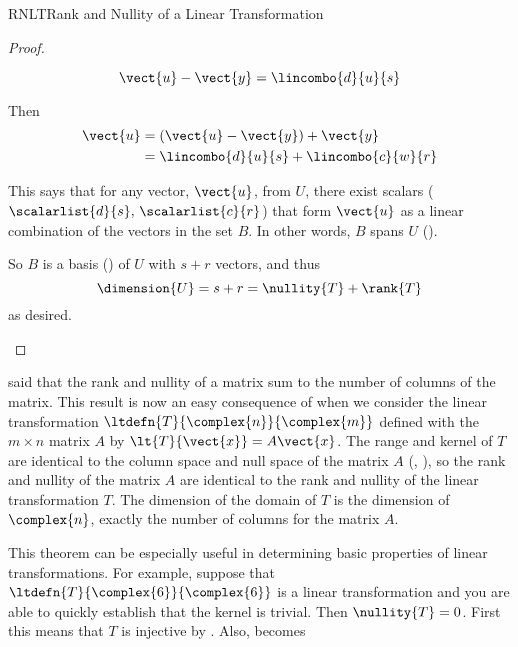 \begin{subsect}{RNLT}{Rank and Nullity of a Linear Transformation}
\begin{proof}
\begin{para}
%
\begin{equation*}
\vect{u}-\vect{y}=\lincombo{d}{u}{s}
\end{equation*}
\end{para}
%
\begin{para}Then
%
\begin{align*}
\vect{u}&=\left(\vect{u}-\vect{y}\right)+\vect{y}\\
&=\lincombo{d}{u}{s}+\lincombo{c}{w}{r}
\end{align*}
\end{para}
%
\begin{para}This says that for any vector, $\vect{u}$, from $U$, there exist scalars ($\scalarlist{d}{s},\,\scalarlist{c}{r}$) that form $\vect{u}$ as a linear combination of the vectors in the set $B$.  In other words, $B$ spans $U$ ().\end{para}
%
\begin{para}So $B$ is a basis () of $U$ with $s+r$ vectors, and thus
%
\begin{equation*}
\dimension{U}=s+r=\nullity{T}+\rank{T}
\end{equation*}
%
as desired.\end{para}
%
\end{proof}
%
\begin{para} said that the rank and nullity of a matrix sum to the number of columns of the matrix.  This result is now an easy consequence of  when we consider the linear transformation $\ltdefn{T}{\complex{n}}{\complex{m}}$ defined with the $m\times n$ matrix $A$ by $\lt{T}{\vect{x}}=A\vect{x}$.  The range and kernel of $T$ are identical to the column space and null space of the matrix $A$ (, ), so the rank and nullity of the matrix $A$ are identical to the rank and nullity of the linear transformation $T$.  The dimension of the domain of $T$ is the dimension of $\complex{n}$, exactly the number of columns for the matrix $A$.\end{para}
%
\begin{para}This theorem can be especially useful in determining basic properties of linear transformations.  For example, suppose that $\ltdefn{T}{\complex{6}}{\complex{6}}$ is a linear transformation and you are able to quickly establish that the kernel is trivial.  Then $\nullity{T}=0$.  First this means that $T$ is injective by .  Also,  becomes

\end{para}
\end{subsect}
